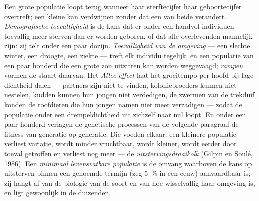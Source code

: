 \begin{definition}\label{def:b3:conservation-biology:small}
Een grote populatie loopt terug wanneer haar sterftecijfer haar
geboortecijfer overtreft; een kleine kan verdwijnen zonder dat een van
beide verandert. \emph{Demografische toevalligheid} is de kans dat er
onder een handvol individuen toevallig meer sterven dan er worden
geboren, of dat alle overlevenden mannelijk zijn: zij telt onder een
paar dozijn. \emph{Toevalligheid van de omgeving} --- een slechte
winter, een droogte, een ziekte --- treft elk individu tegelijk, en een
populatie van een paar honderd die een grote zou uitzitten kan worden
weggevaagd; \emph{rampen} vormen de staart daarvan. Het
\emph{Allee-effect} laat het groeitempo per hoofd bij lage dichtheid
dalen --- partners zijn niet te vinden, koloniebroeders kunnen niet
nestelen, kudden kunnen hun jongen niet verdedigen, de zwermen van de
trekduif konden de roofdieren die hun jongen namen niet meer verzadigen
--- zodat de populatie onder een drempeldichtheid uit zichzelf naar nul
loopt. En onder een paar honderd verlagen de genetische processen van
de volgende paragraaf de fitness van generatie op generatie. Die voeden
elkaar: een kleinere populatie verliest variatie, wordt minder
vruchtbaar, wordt kleiner, wordt eerder door toeval getroffen en
verliest nog meer --- de \emph{uitstervingsdraaikolk} (Gilpin en Soulé,
1986). Een \emph{minimaal levensvatbare populatie} is de omvang
waarboven de kans op uitsterven binnen een genoemde termijn (zeg
\qty{5}{\%} in een eeuw) aanvaardbaar is; zij hangt af van de biologie
van de soort en van hoe wisselvallig haar omgeving is, en ligt
gewoonlijk in de duizenden.
\end{definition}

